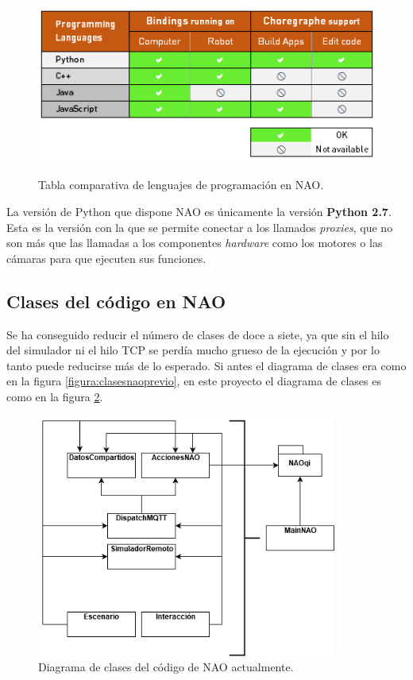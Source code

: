 \documentclass[12pt,spanish,listoffigures,listoftables]{tfgetsinf}
\begin{document}
\begin{figure}[!h]
	\centering
	\includegraphics[height=6cm]{img/supported_language}
	\caption{Tabla comparativa de lenguajes de programación en NAO.}
	\label{figura:comparativalenguajes}
\end{figure}

La versión de Python que dispone NAO es únicamente la versión \textbf{Python 2.7}. Esta es la versión con la que se permite conectar a los llamados \textit{proxies}, que no son más que las llamadas a los componentes \textit{hardware} como los motores o las cámaras para que ejecuten sus funciones. 

\newpage
\subsection{Clases del código en NAO}

Se ha conseguido reducir el número de clases de doce a siete, ya que sin el hilo del simulador ni el hilo TCP se perdía mucho grueso de la ejecución y por lo tanto puede reducirse más de lo esperado. Si antes el diagrama de clases era como en la figura \ref{figura:clasesnaoprevio}, en este proyecto el diagrama de clases es como en la figura \ref{figura:naoprogramaactual}.

\begin{figure}[!h]
	\centering
	\includegraphics[height=8cm]{img/clasesnaonuevo}
	\caption{Diagrama de clases del código de NAO actualmente.}
	\label{figura:naoprogramaactual}
\end{figure}
\end{document}
